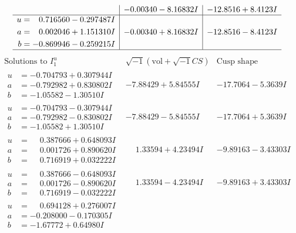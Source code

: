 \documentclass[1p]{elsarticle_modified}
\theoremstyle{definition}
\newcommand{\I}{\sqrt{-1}}
\begin{document}
$$\begin{array}{c|c|c}
 & -0.00340 - 8.16832 I & -12.8516 + 8.4123 I \\ \hline\begin{aligned}
u &= \phantom{-}0.716560 - 0.297487 I \\
a &= \phantom{-}0.002046 + 1.151310 I \\
b &= -0.869946 - 0.259215 I\end{aligned}
 & -0.00340 + 8.16832 I & -12.8516 - 8.4123 I\\
 \hline 
 \end{array}$$\newpage$$\begin{array}{c|c|c}  
\text{Solutions to }I^u_{1}& \I (\text{vol} + \sqrt{-1}CS) & \text{Cusp shape}\\
 \hline 
\begin{aligned}
u &= -0.704793 + 0.307944 I \\
a &= -0.792982 + 0.830802 I \\
b &= -1.05582 - 1.30510 I\end{aligned}
 & -7.88429 + 5.84555 I & -17.7064 - 5.3639 I \\ \hline\begin{aligned}
u &= -0.704793 - 0.307944 I \\
a &= -0.792982 - 0.830802 I \\
b &= -1.05582 + 1.30510 I\end{aligned}
 & -7.88429 - 5.84555 I & -17.7064 + 5.3639 I \\ \hline\begin{aligned}
u &= \phantom{-}0.387666 + 0.648093 I \\
a &= \phantom{-}0.001726 + 0.890620 I \\
b &= \phantom{-}0.716919 + 0.032222 I\end{aligned}
 & \phantom{-}1.33594 + 4.23494 I & -9.89163 - 3.43303 I \\ \hline\begin{aligned}
u &= \phantom{-}0.387666 - 0.648093 I \\
a &= \phantom{-}0.001726 - 0.890620 I \\
b &= \phantom{-}0.716919 - 0.032222 I\end{aligned}
 & \phantom{-}1.33594 - 4.23494 I & -9.89163 + 3.43303 I \\ \hline\begin{aligned}
u &= \phantom{-}0.694128 + 0.276007 I \\
a &= -0.208000 - 0.170305 I \\
b &= -1.67772 + 0.64980 I\end{aligned}

\end{array}$$
\end{document}
